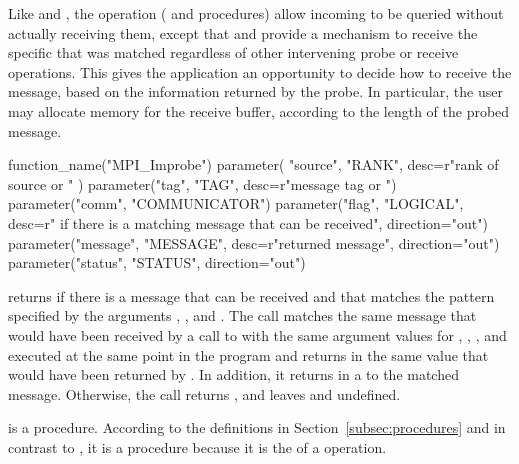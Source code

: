 Like  and , the
 operation (%
 and  procedures) allow incoming
 to be queried without actually receiving them, except that
 and  provide a mechanism to receive the specific
 that was matched regardless of other intervening probe or
receive operations. This gives the application an opportunity to decide
how to receive the message, based on the information returned by
the probe. In particular, the user may allocate memory for the receive
buffer, according to the length of the probed message.

\begin{mpi-binding}
    function_name("MPI_Improbe")
    parameter(
        "source", "RANK", desc=r"rank of source or "
    )
    parameter("tag", "TAG", desc=r"message tag or ")
    parameter("comm", "COMMUNICATOR")
    parameter("flag", "LOGICAL", desc=r" if there is a matching message that can be received", direction="out")
    parameter("message", "MESSAGE", desc=r"returned message", direction="out")
    parameter("status", "STATUS", direction="out")
\end{mpi-binding}

 returns
 if there is a message that can be received and that
matches the pattern specified by the arguments ,
, and . The call matches the same message that
would have been received by a call to  with the same argument values for , ,
, and  executed at the same point in the program and returns
in  the same value that would have been returned by
. In addition, it returns in  a 
to the matched message.  Otherwise, the call returns ,
and leaves  and  undefined.

 is a  procedure.
According to the definitions in Section~\ref{subsec:procedures} and
in contrast to , it is a  procedure
because it is the  of a  operation.

